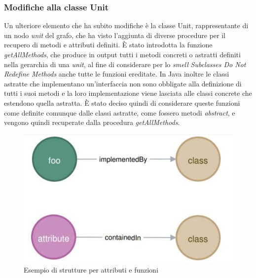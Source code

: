         \subsubsection{Modifiche alla classe Unit}
            Un ulteriore elemento che ha subito modifiche è la classe Unit, rappresentante di un nodo \textit{unit} del grafo, che ha visto l'aggiunta di diverse procedure per il recupero di metodi e attributi definiti. È stato introdotta la funzione \textit{getAllMethods}, che produce in output tutti i metodi concreti o astratti definiti nella gerarchia di una \textit{unit}, al fine di considerare per lo \textit{smell} \textit{Subclasses Do Not Redefine Methods} anche tutte le funzioni ereditate. 
            In Java inoltre le classi astratte che implementano un'interfaccia non sono obbligate alla definizione di tutti i suoi metodi e la loro implementazione viene lasciata alle classi concrete che estendono quella astratta. È stato deciso quindi di considerare queste funzioni come definite comunque dalle classi astratte, come fossero metodi \textit{abstract}, e vengono quindi recuperate dalla procedura \textit{getAllMethods}.
            \begin{figure}[h]
                \centering
                \includegraphics[scale=0.8]{Tesi/Sezione3-RiconoscimentoSmell/immagini/Cattura3.jpg}
                \caption{Esempio di strutture per attributi e funzioni}
            \end{figure}    
